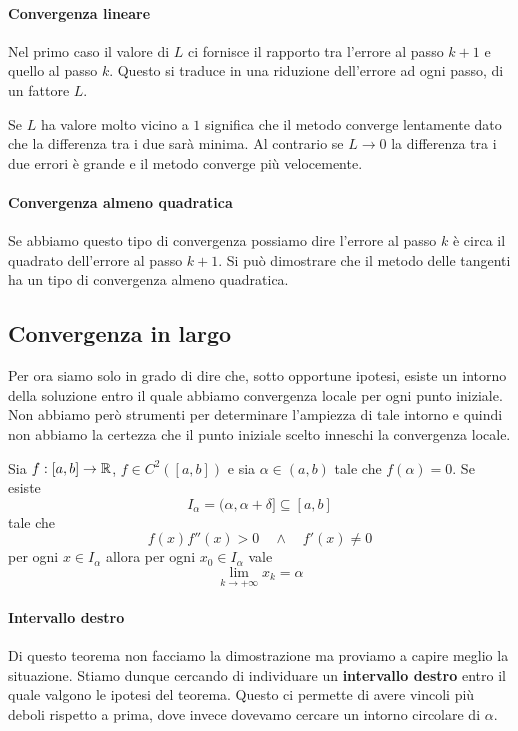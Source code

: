 \paragraph{Convergenza lineare}
Nel primo caso il valore di $L$ ci fornisce il rapporto tra l'errore al passo $k+1$ e quello al passo $k$. Questo
si traduce in una riduzione dell'errore ad ogni passo, di un fattore $L$.

Se $L$ ha valore molto vicino a $1$ significa che il metodo converge lentamente dato che la differenza tra i due
sarà minima. Al contrario se $L \to 0$ la differenza tra i due errori è grande e il metodo converge più
velocemente.

\paragraph{Convergenza almeno quadratica}
Se abbiamo questo tipo di convergenza possiamo dire l'errore al passo $k$ è circa il quadrato dell'errore al passo
$k+1$. Si può dimostrare che il metodo delle tangenti ha un tipo di convergenza almeno quadratica.

\subsection{Convergenza in largo}
Per ora siamo solo in grado di dire che, sotto opportune ipotesi, esiste un intorno della soluzione entro il quale
abbiamo convergenza locale per ogni punto iniziale. Non abbiamo però strumenti per determinare l'ampiezza di
tale intorno e quindi non abbiamo la certezza che il punto iniziale scelto inneschi la convergenza locale.

\begin{theorem}\label{th: convergenza_largo}
	Sia $f : [a, b] \to \mathbb{R}$, $f \in C^2([a, b])$ e sia $\alpha \in (a, b)$ tale che $f(\alpha) = 0$. Se esiste
	\[ I_\alpha = (\alpha, \alpha + \delta] \subseteq [a, b] \]
	tale che
	\[ f(x) f''(x) > 0 \quad \wedge \quad f'(x) \neq 0 \]
	per ogni $x \in I_\alpha$ allora per ogni $x_0 \in I_\alpha$ vale
	\[ \lim_{k \to +\infty} x_k = \alpha \]
\end{theorem}

\paragraph{Intervallo destro}
Di questo teorema non facciamo la dimostrazione ma proviamo a capire meglio la situazione. Stiamo dunque cercando
di individuare un \textbf{intervallo destro} entro il quale valgono le ipotesi del teorema. Questo ci permette di
avere vincoli più deboli rispetto a prima, dove invece dovevamo cercare un intorno circolare di $\alpha$.

